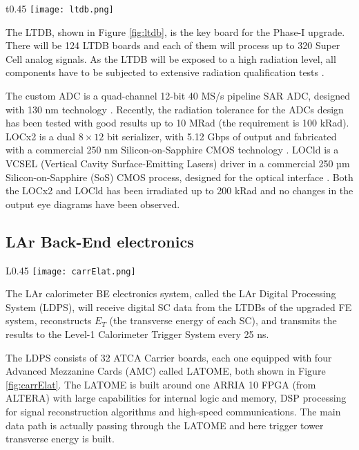 \documentclass{llncs}
\begin{document}
\begin{wrapfigure}{t}{0.45\textwidth}
\vspace{-25pt}
  \centering
    \texttt{[image: ltdb.png]}
  \caption{LTDB board under test.}
  \label{fig:ltdb}
 \vspace{-20pt}
\end{wrapfigure}

The LTDB, shown in Figure \ref{fig:ltdb}, is the key board for the Phase-I upgrade. There will be 124 LTDB boards and each of them will process up to 320 Super Cell analog signals. As the LTDB will be exposed to a high radiation level, all components have to be subjected to extensive radiation qualification tests \cite{Buchanan:1151347}.

The custom ADC is a quad-channel 12-bit 40 MS/s pipeline SAR ADC, designed with 130 nm technology \cite{Xu:2229579}. Recently, the radiation tolerance for the ADCs design has been tested with good results up to 10 MRad (the requirement is 100 kRad).
LOCx2 is a dual $8 \times 12$ bit serializer, with 5.12 Gbps of output and fabricated with a commercial 250 nm Silicon-on-Sapphire CMOS technology \cite{1748-0221-11-02-C02013}. LOCld is a VCSEL (Vertical Cavity Surface-Emitting Lasers) driver in a commercial 250 µm Silicon-on-Sapphire (SoS) CMOS process, designed for the optical interface \cite{1748-0221-8-01-C01031}. Both the LOCx2 and LOCld has been irradiated up to 200 kRad and no changes in the output eye diagrams have been observed.

\subsection{LAr Back-End electronics}
\begin{wrapfigure}{L}{0.45\textwidth}
\vspace{-25pt}
  \centering
    \texttt{[image: carrElat.png]}
	\caption{ATCA Carrier and LATOME board.}
	\label{fig:carrElat}
 \vspace{-20pt}
\end{wrapfigure}
The LAr calorimeter BE electronics system, called the LAr Digital Processing System (LDPS), will receive digital SC data from the LTDBs of the upgraded FE system, reconstructs $E_{T}$ (the transverse energy of each SC), and transmits the results to the Level-1 Calorimeter Trigger System every 25 ns. 

The LDPS consists of 32 ATCA Carrier boards, each one equipped with four Advanced Mezzanine Cards (AMC) called LATOME, both shown in Figure \ref{fig:carrElat}. 
The LATOME is built around one ARRIA 10 FPGA (from ALTERA) with large capabilities for internal logic and memory, DSP processing for signal reconstruction algorithms and high-speed communications. The main data path is actually passing through the LATOME and here trigger tower transverse energy is built.
\end{document}
